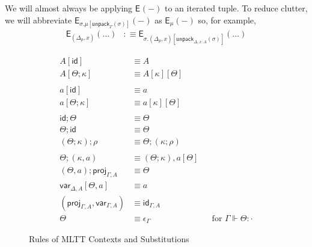 \documentclass[10pt]{article}
\theoremstyle{definition}
\newcommand{\CTX}{\,\,\mathsf{Ctx}}
\newcommand{\TYPE}{\,\,\mathsf{Type}}
\newcommand{\id}{\mathsf{id}}
\newcommand\E[2]{\ensuremath{\mathsf{E}_{#1}(#2)}}
\newcommand\unpack[2]{\ensuremath{\mathsf{unpack}_{#1}(#2)}}
\newcommand{\modeof}[1]{{#1}_p}
\newcommand{\qyields}{\Vdash}
\newcommand\proj[1]{\ensuremath{\mathsf{proj}_{#1}}}
\newcommand\qvar[1]{\ensuremath{\mathsf{var}_{#1}}}
\begin{document}
We will almost always be applying $\E{}{-}$ to an iterated tuple. To reduce clutter, we will abbreviate $\E{\sigma.\mu[\unpack{\Gamma}{\sigma}]}{-}$ as $\E{\mu}{-}$ so, for example, 
\begin{align*}
\E{(\modeof{\Delta}, x)}{\dots} &:\equiv \E{\sigma.(\modeof{\Delta}, x)[\unpack{\Delta, x : A}{\sigma}]}{\dots}
\end{align*}

\begin{figure}

\begin{align}
A[\id] &\equiv A \\
A[\Theta ; \kappa] &\equiv A[\kappa][\Theta] \\
\nonumber\\
a[\id] &\equiv a \\
a[\Theta ; \kappa] &\equiv a[\kappa][\Theta] \\
\nonumber\\
\id ; \Theta &\equiv \Theta \\
\Theta ; \id &\equiv \Theta \\
(\Theta; \kappa) ; \rho &\equiv \Theta ; (\kappa ; \rho) \\
\nonumber\\
\Theta ; (\kappa , a) &\equiv (\Theta ; \kappa) , a[\Theta] \\ 
(\Theta, a);\proj{\Gamma,A} &\equiv \Theta \\
\qvar{\Delta,A}[\Theta, a] &\equiv a \\
(\proj{\Gamma,A}, \qvar{\Gamma,A}) &\equiv \id_{\Gamma, A} \\
\Theta &\equiv \epsilon_\Gamma && \text{for } \Gamma \qyields \Theta : \cdot
\end{align}
\caption{Rules of MLTT Contexts and Substitutions}\label{fig:qit-rules}
\end{figure}
\end{document}

